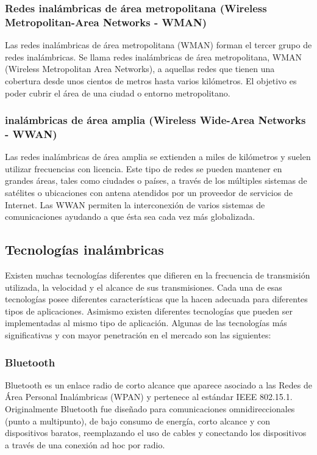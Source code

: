 	\subsubsection{\textbf{Redes inalámbricas de área metropolitana (Wireless Metropolitan-Area Networks - WMAN)}}
	Las redes inalámbricas de área metropolitana (WMAN) forman el tercer grupo de redes inalámbricas. Se llama redes inalámbricas de área metropolitana, WMAN (Wireless Metropolitan Area Networks), a aquellas redes que tienen una cobertura desde unos cientos de metros hasta varios kilómetros. El objetivo es poder cubrir el área de una ciudad o entorno metropolitano. 
	
	\subsubsection{\textbf{inalámbricas de área amplia (Wireless Wide-Area Networks - WWAN)}}
	Las redes inalámbricas de área amplia se extienden a miles de kilómetros y suelen utilizar frecuencias con licencia. Este tipo de redes se pueden mantener en grandes áreas, tales como ciudades o países, a través de los múltiples sistemas de satélites o ubicaciones con antena atendidos por un proveedor de servicios de Internet. Las WWAN permiten la interconexión de varios sistemas de comunicaciones ayudando a que ésta sea cada vez más globalizada.

	\subsection{Tecnologías inalámbricas}
	Existen muchas tecnologías diferentes que difieren en la frecuencia de transmisión utilizada, la velocidad y el alcance de sus transmisiones. Cada una de esas tecnologías posee diferentes características que la hacen adecuada para diferentes tipos de aplicaciones. Asimismo existen diferentes tecnologías que pueden ser implementadas al mismo tipo de aplicación. Algunas de las tecnologías más significativas y con mayor penetración en el mercado son las siguientes:
	
	\subsubsection{Bluetooth}
	Bluetooth es un enlace radio de corto alcance que aparece asociado a las Redes de Área Personal Inalámbricas (WPAN) y pertenece al estándar IEEE 802.15.1. Originalmente Bluetooth fue diseñado para comunicaciones omnidireccionales (punto a multipunto), de bajo consumo de energía, corto alcance y con dispositivos baratos, reemplazando el uso de cables y conectando los dispositivos a través de una conexión ad hoc por radio. \\
		
